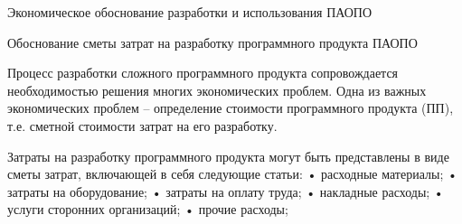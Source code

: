 \newpage

\begin{center}
Экономическое обоснование разработки и использования ПАОПО
\end{center}

Обоснование сметы  затрат на разработку программного продукта ПАОПО

Процесс разработки сложного программного продукта сопровождается необходимостью решения многих экономических проблем. Одна из важных экономических проблем – определение стоимости программного продукта (ПП), т.е.  сметной стоимости затрат  на его разработку.

Затраты на разработку программного продукта могут быть представлены в виде сметы затрат, включающей в себя следующие статьи:
•	расходные материалы;
•	затраты на оборудование;
•	затраты на оплату труда;
•	накладные расходы;
•	услуги сторонних организаций;
•	прочие расходы;
